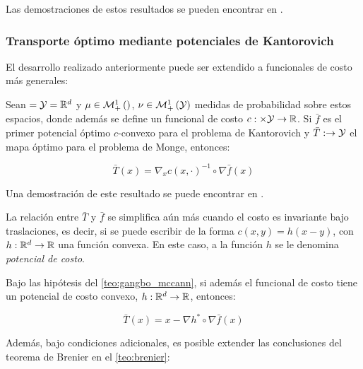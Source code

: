 Las demostraciones de estos resultados se pueden encontrar en \cite{Thorpe2018}.

\subsubsection{Transporte óptimo mediante potenciales de Kantorovich}

El desarrollo realizado anteriormente puede ser extendido a funcionales de costo más generales:

\begin{teo}
	\label{teo:gangbo_mccann}
	Sean $=\mathcal{Y}=\mathbb{R}^d$ y $\mu\in\mathcal{M}_+^1\left(\right)$, $\nu\in\mathcal{M}_+^1\left(\mathcal{Y}\right)$ medidas de probabilidad sobre estos espacios, donde además se define un funcional de costo $c:\times\mathcal{Y}\to\mathbb{R}$. Si $\bar f$ es el primer potencial óptimo $c$-convexo para el problema de Kantorovich y $\bar T:\to\mathcal{Y}$ el mapa óptimo para el problema de Monge, entonces:

	\begin{equation}
		\bar T(x) = \nabla_x c(x,\cdot)^{-1}\circ \nabla \bar f(x)
	\end{equation}
\end{teo}

Una demostración de este resultado se puede encontrar en \cite{bunne2023optimal}.

La relación entre $\bar T$ y $\bar f$ se simplifica aún más cuando el costo es invariante bajo traslaciones, es decir, si se puede escribir de la forma $c(x,y)=h(x-y)$, con $h:\mathbb{R}^d\to\mathbb{R}$ una función convexa. En este caso, a la función $h$ se le denomina \textit{potencial de costo}.

\begin{cor}
	Bajo las hipótesis del \autoref{teo:gangbo_mccann}, si además el funcional de costo tiene un potencial de costo convexo, $h:\mathbb{R}^d\to\mathbb{R}$, entonces:

	\begin{equation}
		\bar T(x) = x - \nabla h^* \circ \nabla \bar f(x)
	\end{equation}
\end{cor}

Además, bajo condiciones adicionales, es posible extender las conclusiones del teorema de Brenier en el \autoref{teo:brenier}:

